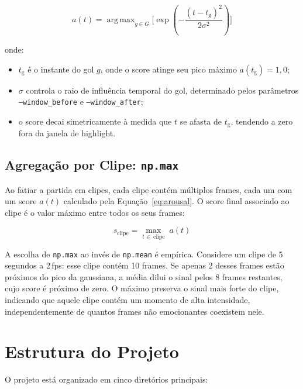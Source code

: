 \documentclass[12pt, a4paper]{article}
\DeclareMathOperator*{\argmax}{arg\,max}
\begin{document}
\begin{equation}
    a(t) = \argmax_{g \in G} \Bigg[ \exp\left(-\frac{(t - t_{\text{g}})^2}{2\sigma^2}\right)\Bigg]
    \label{eq:arousal}
\end{equation}

\noindent onde:
\begin{itemize}
    \item $t_{\text{g}}$ é o instante do gol $g$, onde o score atinge seu pico máximo $a(t_{\text{g}}) = 1{,}0$;
    \item $\sigma$ controla o raio de influência temporal do gol, determinado pelos parâmetros \texttt{--window\_before} e \texttt{--window\_after};
    \item o score decai simetricamente à medida que $t$ se afasta de $t_{\text{g}}$, tendendo a zero fora da janela de highlight.
\end{itemize}

\subsection{Agregação por Clipe: \texttt{np.max}}

Ao fatiar a partida em clipes, cada clipe contém múltiplos frames, cada um com um score $a(t)$ calculado pela Equação~\ref{eq:arousal}. O score final associado ao clipe é o valor máximo entre todos os seus frames:

\begin{equation}
    s_{\text{clipe}} = \max_{t \,\in\, \text{clipe}}\; a(t)
\end{equation}

A escolha de \texttt{np.max} ao invés de \texttt{np.mean} é empírica. Considere um clipe de 5 segundos a 2\,fps: esse clipe contém 10 frames. Se apenas 2 desses frames estão próximos do pico da gaussiana, a média dilui o sinal pelos 8 frames restantes, cujo score é próximo de zero. O máximo preserva o sinal mais forte do clipe, indicando que aquele clipe contém um momento de alta intensidade, independentemente de quantos frames não emocionantes coexistem nele.

\newpage

\section{Estrutura do Projeto}

O projeto está organizado em cinco diretórios principais:
\end{document}
